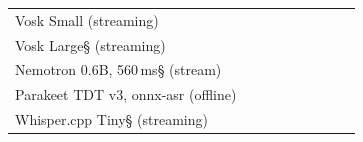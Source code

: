 \documentclass[letterpaper]{article}
\begin{document}
{\begin{tabularx}{\textwidth}{@{}Y R{1.40cm} R{1.22cm} R{1.10cm} R{1.10cm} R{1.15cm} R{1.40cm} R{1.28cm} R{1.52cm}@{}}
Vosk Small (streaming) & \hmcell{\HmSpeedVoskSmall}{\rone{\ColdVoskSmallSpeed}\x} & \hmcell{\HmCoreVoskSmall}{\ColdVoskSmallCorePct\%} & \hmcell{\HmCleanVoskSmall}{\ColdVoskSmallWerClean\%} & \hmcell{\HmOtherVoskSmall}{\ColdVoskSmallWerOther\%} & \hmcell{\HmWerVoskSmall}{\ColdVoskSmallWer\%} &  &  & \hmcell{\HmEnergyVoskSmall}{\ColdVoskSmallEnergyRseven} \\
Vosk Large\S{} (streaming) & \hmcell{\HmSpeedVoskLarge}{\rone{\ColdVoskLargeSpeed}\x} & \hmcell{\HmCoreVoskLarge}{\ColdVoskLargeCorePct\%} & \hmcell{\HmCleanVoskLarge}{\ColdVoskLargeWerClean\%} & \hmcell{\HmOtherVoskLarge}{\ColdVoskLargeWerOther\%} & \hmcell{\HmWerVoskLarge}{\ColdVoskLargeWer\%} &  &  & \hmcell{\HmEnergyVoskLarge}{\ColdVoskLargeEnergyRseven} \\
Nemotron 0.6B, 560\,ms\S{} (stream) & \hmcell{\HmSpeedNemoFiveSixty}{\rone{\ColdNemoFiveSixtySpeed}\x} & \hmcell{\HmCoreNemoFiveSixty}{\ColdNemoFiveSixtyCorePct\%} & \hmcell{\HmCleanNemoFiveSixty}{\ColdNemoFiveSixtyWerClean\%} & \hmcell{\HmOtherNemoFiveSixty}{\ColdNemoFiveSixtyWerOther\%} & \hmcell{\HmWerNemoFiveSixty}{\ColdNemoFiveSixtyWer\%} &  &  & \hmcell{\HmEnergyNemoFiveSixty}{\ColdNemoFiveSixtyEnergyRseven} \\
Parakeet TDT v3, onnx-asr (offline) & \hmcell{\HmSpeedParakeetOnnx}{\rone{\ColdParakeetOnnxAsrSpeed}\x} & \hmcell{\HmCoreParakeetOnnx}{\ColdParakeetOnnxAsrCorePct\%} & \hmcell{\HmCleanParakeetOnnx}{\ColdParakeetOnnxAsrWerClean\%} & \hmcell{\HmOtherParakeetOnnx}{\ColdParakeetOnnxAsrWerOther\%} & \hmcell{\HmWerParakeetOnnx}{\ColdParakeetOnnxAsrWer\%} &  &  & \hmcell{\HmEnergyParakeetOnnx}{\ColdParakeetOnnxAsrEnergyRseven} \\
Whisper.cpp Tiny\S{} (streaming) & \hmcell{\HmSpeedWhisperTiny}{\rone{\ColdWhisperCppTinySpeed}\x} & \hmcell{\HmCoreWhisperTiny}{\ColdWhisperCppTinyCorePct\%} & \hmcell{\HmCleanWhisperTiny}{\ColdWhisperCppTinyWerClean\%} & \hmcell{\HmOtherWhisperTiny}{\ColdWhisperCppTinyWerOther\%} & \hmcell{\HmWerWhisperTiny}{\ColdWhisperCppTinyWer\%} &  &  & \hmcell{\HmEnergyWhisperTiny}{\ColdWhisperCppTinyEnergyRseven} \\

\end{tabularx}}
\end{document}
